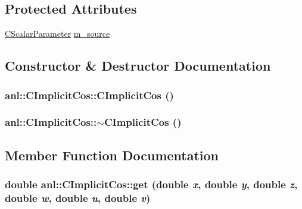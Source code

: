 \subsection*{Protected Attributes}
\begin{DoxyCompactItemize}
\item 
\hyperlink{classanl_1_1CScalarParameter}{CScalarParameter} \hyperlink{classanl_1_1CImplicitCos_a3a07d5f761cc56b9aece0d9159ea574c}{m\_\-source}
\end{DoxyCompactItemize}


\subsection{Constructor \& Destructor Documentation}
\hypertarget{classanl_1_1CImplicitCos_a0e74b5729f3c7b99fbd322f67a578d33}{
\subsubsection[{CImplicitCos}]{\setlength{\rightskip}{0pt plus 5cm}anl::CImplicitCos::CImplicitCos ()}}
\label{classanl_1_1CImplicitCos_a0e74b5729f3c7b99fbd322f67a578d33}
\hypertarget{classanl_1_1CImplicitCos_a58c95d971d6b156b30739a382d213a05}{
\subsubsection[{$\sim$CImplicitCos}]{\setlength{\rightskip}{0pt plus 5cm}anl::CImplicitCos::$\sim$CImplicitCos ()}}
\label{classanl_1_1CImplicitCos_a58c95d971d6b156b30739a382d213a05}


\subsection{Member Function Documentation}
\hypertarget{classanl_1_1CImplicitCos_ad96831fb125b4c63bd17cd5f8064a64f}{
\subsubsection[{get}]{\setlength{\rightskip}{0pt plus 5cm}double anl::CImplicitCos::get (double {\em x}, \/  double {\em y}, \/  double {\em z}, \/  double {\em w}, \/  double {\em u}, \/  double {\em v})}}
\label{classanl_1_1CImplicitCos_ad96831fb125b4c63bd17cd5f8064a64f}


